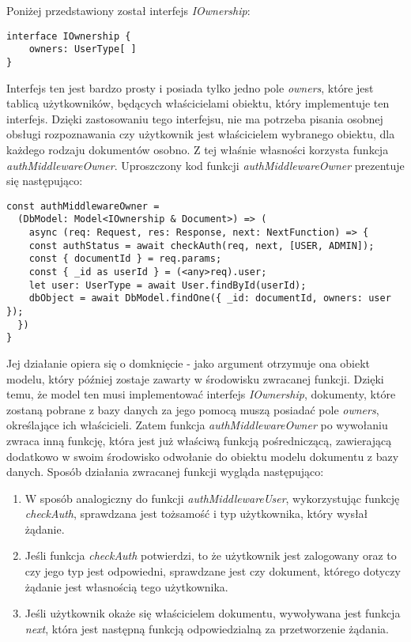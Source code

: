 \documentclass[a4paper,12pt,twoside,openany]{report}
\begin{document}
Poniżej przedstawiony został interfejs \textit{IOwnership}:
\begin{verbatim}
interface IOwnership {
    owners: UserType[ ]
} 
\end{verbatim}
Interfejs ten jest bardzo prosty i posiada tylko jedno pole \textit{owners}, które jest tablicą użytkowników, będących właścicielami obiektu, który implementuje ten interfejs. Dzięki zastosowaniu tego interfejsu, nie ma potrzeba pisania osobnej obsługi rozpoznawania czy użytkownik jest właścicielem wybranego obiektu, dla każdego rodzaju dokumentów osobno. Z tej właśnie własności korzysta funkcja \textit{authMiddlewareOwner}.
\newpage
Uproszczony kod funkcji \textit{authMiddlewareOwner} prezentuje się następująco:
\begin{verbatim}
const authMiddlewareOwner = 
  (DbModel: Model<IOwnership & Document>) => (
    async (req: Request, res: Response, next: NextFunction) => {
    const authStatus = await checkAuth(req, next, [USER, ADMIN]);
    const { documentId } = req.params;
    const { _id as userId } = (<any>req).user;
    let user: UserType = await User.findById(userId);
    dbObject = await DbModel.findOne({ _id: documentId, owners: user });           
  })
}
\end{verbatim}

Jej działanie opiera się o domknięcie - jako argument otrzymuje ona obiekt modelu, który później zostaje zawarty w środowisku zwracanej funkcji. Dzięki temu, że model ten musi implementować interfejs \textit{IOwnership}, dokumenty, które zostaną pobrane z bazy danych za jego pomocą muszą posiadać pole \textit{owners}, określające ich właścicieli.
Zatem funkcja  \textit{authMiddlewareOwner} po wywołaniu zwraca inną funkcję, która jest już właściwą funkcją pośredniczącą, zawierającą dodatkowo w swoim środowisko odwołanie do obiektu modelu dokumentu z bazy danych. Sposób działania zwracanej funkcji wygląda następująco:

\begin{enumerate}
	
	\item W sposób analogiczny do funkcji \textit{authMiddlewareUser}, wykorzystując funkcję \textit{checkAuth}, sprawdzana jest tożsamość i typ użytkownika, który wysłał żądanie.
	
	\item Jeśli funkcja \textit{checkAuth} potwierdzi, to że użytkownik jest zalogowany oraz to czy jego typ jest odpowiedni, sprawdzane jest czy dokument, którego dotyczy żądanie jest własnością tego użytkownika. 
	
	\item Jeśli użytkownik okaże się właścicielem dokumentu, wywoływana jest funkcja \textit{next}, która jest następną funkcją odpowiedzialną za przetworzenie żądania.
\end{enumerate}
\end{document}
